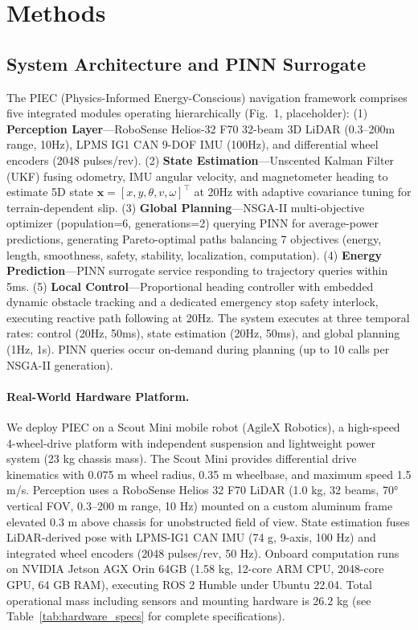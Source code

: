 \documentclass[pdflatex,sn-nature]{sn-jnl}%
\begin{document}
\section{Methods}

\subsection{System Architecture and PINN Surrogate}

The PIEC (Physics-Informed Energy-Conscious) navigation framework comprises five integrated modules operating hierarchically (Fig.~1, placeholder): (1) \textbf{Perception Layer}—RoboSense Helios-32 F70 32-beam 3D LiDAR (0.3--200m range, 10Hz), LPMS IG1 CAN 9-DOF IMU (100Hz), and differential wheel encoders (2048 pulses/rev). (2) \textbf{State Estimation}—Unscented Kalman Filter (UKF) fusing odometry, IMU angular velocity, and magnetometer heading to estimate 5D state $\mathbf{x} = [x, y, \theta, v, \omega]^\top$ at 20Hz with adaptive covariance tuning for terrain-dependent slip. (3) \textbf{Global Planning}—NSGA-II multi-objective optimizer (population=6, generations=2) querying PINN for average-power predictions, generating Pareto-optimal paths balancing 7 objectives (energy, length, smoothness, safety, stability, localization, computation). (4) \textbf{Energy Prediction}—PINN surrogate service responding to trajectory queries within 5ms. (5) \textbf{Local Control}—Proportional heading controller with embedded dynamic obstacle tracking and a dedicated emergency stop safety interlock, executing reactive path following at 20Hz. The system executes at three temporal rates: control (20Hz, 50ms), state estimation (20Hz, 50ms), and global planning (1Hz, 1s). PINN queries occur on-demand during planning (up to 10 calls per NSGA-II generation).

\paragraph{Real-World Hardware Platform.}
We deploy PIEC on a Scout Mini mobile robot (AgileX Robotics), a high-speed 4-wheel-drive platform with independent suspension and lightweight power system (23 kg chassis mass). The Scout Mini provides differential drive kinematics with 0.075 m wheel radius, 0.35 m wheelbase, and maximum speed 1.5 m/s. Perception uses a RoboSense Helios 32 F70 LiDAR (1.0 kg, 32 beams, 70° vertical FOV, 0.3--200 m range, 10 Hz) mounted on a custom aluminum frame elevated 0.3 m above chassis for unobstructed field of view. State estimation fuses LiDAR-derived pose with LPMS-IG1 CAN IMU (74 g, 9-axis, 100 Hz) and integrated wheel encoders (2048 pulses/rev, 50 Hz). Onboard computation runs on NVIDIA Jetson AGX Orin 64GB (1.58 kg, 12-core ARM CPU, 2048-core GPU, 64 GB RAM), executing ROS 2 Humble under Ubuntu 22.04. Total operational mass including sensors and mounting hardware is 26.2 kg (see Table~\ref{tab:hardware_specs} for complete specifications).
\end{document}
